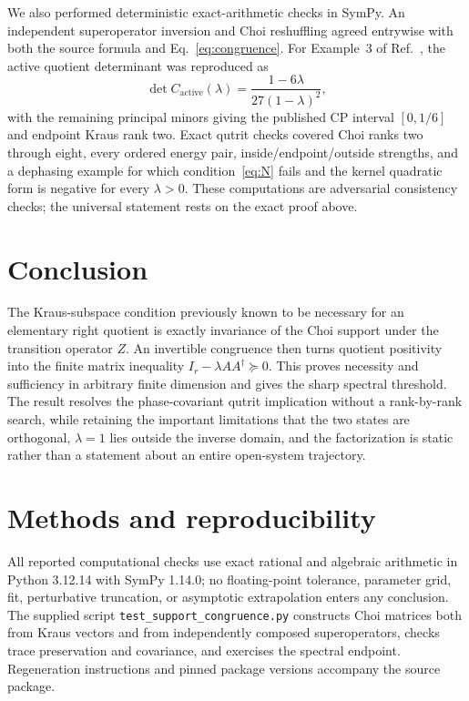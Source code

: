 \documentclass[aip,jmp,preprint]{revtex4-2}
\begin{document}
We also performed deterministic exact-arithmetic checks in SymPy.  An independent superoperator inversion and Choi reshuffling agreed entrywise with both the source formula and Eq.~\eqref{eq:congruence}.  For Example~3 of Ref.~, the active quotient determinant was reproduced as
\begin{equation}
 \det C_{\mathrm{active}}(\lambda)
 =\frac{1-6\lambda}{27(1-\lambda)^2},
\end{equation}
with the remaining principal minors giving the published CP interval $[0,1/6]$ and endpoint Kraus rank two.  Exact qutrit checks covered Choi ranks two through eight, every ordered energy pair, inside/endpoint/outside strengths, and a dephasing example for which condition~\eqref{eq:N} fails and the kernel quadratic form is negative for every $\lambda>0$.  These computations are adversarial consistency checks; the universal statement rests on the exact proof above.

\section{Conclusion}

The Kraus-subspace condition previously known to be necessary for an elementary right quotient is exactly invariance of the Choi support under the transition operator $Z$.  An invertible congruence then turns quotient positivity into the finite matrix inequality $I_r-\lambda AA^\dagger\succeq0$.  This proves necessity and sufficiency in arbitrary finite dimension and gives the sharp spectral threshold.  The result resolves the phase-covariant qutrit implication without a rank-by-rank search, while retaining the important limitations that the two states are orthogonal, $\lambda=1$ lies outside the inverse domain, and the factorization is static rather than a statement about an entire open-system trajectory.

\section*{Methods and reproducibility}

All reported computational checks use exact rational and algebraic arithmetic in Python 3.12.14 with SymPy 1.14.0; no floating-point tolerance, parameter grid, fit, perturbative truncation, or asymptotic extrapolation enters any conclusion.  The supplied script \texttt{test\_support\_congruence.py} constructs Choi matrices both from Kraus vectors and from independently composed superoperators, checks trace preservation and covariance, and exercises the spectral endpoint.  Regeneration instructions and pinned package versions accompany the source package.
\end{document}
